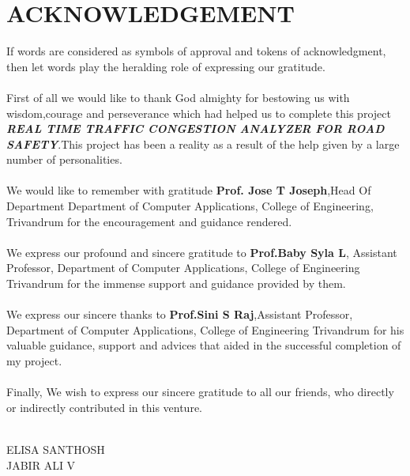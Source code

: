 \chapter*{\rm \large \bf ACKNOWLEDGEMENT}
\vspace{4.0mm}
\setlength{\parindent}{1cm} 


\indent If words are considered as symbols of approval and tokens of acknowledgment, then let words play the heralding role of expressing our gratitude.\\ \\
\indent First of all we would like to thank God almighty for bestowing us with wisdom,courage and perseverance which had helped us to complete this project \textbf{\textit{REAL TIME TRAFFIC CONGESTION ANALYZER FOR ROAD SAFETY}}.This project has been a reality as a result of the help given by a large number of personalities.\\ \\
\indent We would like to remember with gratitude \textbf{Prof. Jose T Joseph},Head Of Department Department of Computer Applications, College of Engineering, Trivandrum for the encouragement and guidance rendered.\\ \\
\indent We express our profound and sincere gratitude to \textbf{Prof.Baby Syla L}, Assistant Professor, Department of Computer Applications, College of Engineering Trivandrum for the immense support and guidance provided by them.\\ \\
\indent We express our sincere thanks to \textbf{Prof.Sini S Raj},Assistant Professor, Department of Computer Applications, College of Engineering Trivandrum for his valuable guidance, support and advices that aided in the successful completion of my project.\\ \\
\indent Finally, We wish to express our sincere gratitude to all our friends, who directly or indirectly contributed in this venture. \\ \\




\begin{flushright}
ELISA SANTHOSH\\
JABIR ALI V
\end{flushright}
\newpage
